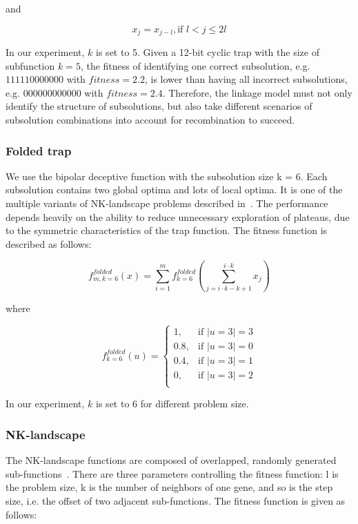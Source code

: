 \documentclass{sig-alternate-05-2015}
\begin{document}
and

\begin{displaymath}
x_j = x_{j-l}, \text{if } l < j \leq 2l
\end{displaymath}

In our experiment, $k$ is set to 5.
Given a 12-bit cyclic trap with the size of subfunction $k = 5$, the fitness of identifying one correct subsolution, e.g. $111110000000$ with $fitness = 2.2$, is lower than having all incorrect subsolutions, e.g. $000000000000$ with $fitness = 2.4$. Therefore, the linkage model  must not only identify the structure of subsolutions, but also take different scenarios of subsolution combinations into account for recombination to succeed.


\subsubsection{Folded trap}
We use the bipolar deceptive function with the subsolution size k = 6. Each subsolution contains two global optima and lots of local optima. It is one of the multiple variants of NK-landscape problems described in~\cite{goldberg:deception}. The performance depends heavily on the ability to reduce unnecessary exploration of plateaus, due to the symmetric characteristics of the trap function.  The fitness function is described as follows:


\begin{displaymath}
f_{m,k=6}^{folded}(x) = \sum_{i=1}^{m} f_{k=6}^{folded} \left (\sum_{j = i\cdot k-k+1}^{i\cdot k} x_j\right )
\end{displaymath}

where

\begin{displaymath}
f_{k=6}^{folded}(u) = 
   \begin{cases}
    1, 		& \text{if $|u=3| = 3$} \\
    0.8, 	& \text{if $|u=3| = 0$} \\
    0.4, 	& \text{if $|u=3| = 1$} \\
    0, 		& \text{if $|u=3| = 2$} \\
	\end{cases}
\end{displaymath}

In our experiment, $k$ is set to 6 for different problem size.


\subsubsection{NK-landscape}
The NK-landscape functions are composed of overlapped, randomly generated sub-functions~\cite{pelikan:overlap}. There are three parameters controlling the fitness function: l is the problem size, k is the number of neighbors of one gene, and so is the step size, i.e. the offset of two adjacent sub-functions. The fitness function is given as follows:
\end{document}

